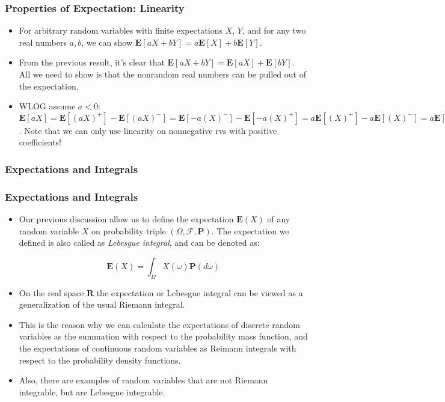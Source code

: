 \documentclass[handout]{beamer}
\newcommand{\BP}{\mathbf{P}}
\newcommand{\BE}{\mathbf{E}}
\begin{document}
\frame
{
  \frametitle{Properties of Expectation: Linearity}

   \begin{itemize}

  \item<1-> [] For arbitrary random variables with finite expectations $X$, $Y$, and for any two real numbers $a,b$, we can show $\BE[aX + bY] = a\BE[X] + b\BE[Y]$.
  
  \item<2-> [] From the previous result, it's clear that $\BE[aX+bY] = \BE[aX] + \BE[bY]$. All we need to show is that the nonrandom real numbers can be pulled out of the expectation.
  
\item<3-> [] WLOG assume $a < 0$: 
$\BE[aX] = \BE[(aX)^+] - \BE[(aX)^-] =  
\BE[-a(X)^-] -  \BE[-a(X)^+] = 
a\BE[(X)^+]  -a\BE[(X)^-]  = a\BE[X]$. Note that we can only use linearity on nonnegative rvs with positive coefficients!


\end{itemize}
}




\subsubsection{Expectations and Integrals }

\frame
{
  \frametitle{Expectations and Integrals}

   \begin{itemize}

   \item<1-> Our previous discussion allow us to define the expectation $\BE(X)$ of any random variable $X$ on probability triple $(\Omega, \mathcal{F}, \BP)$.  The expectation we defined is also called as \textit{Lebesgue integral}, and can be denoted as:
   
   $$\BE(X)=\int_{\Omega} X(\omega) \BP(d \omega) $$
   
     
   \item<2-> On the real space $\mathbf{R}$ the expectation or Lebesgue integral can be viewed as a generalization of the usual Riemann integral. 
   
   \item<3-> This is the reason why we can calculate the expectations of discrete random variables as the summation with respect to the probability mass function, and the expectations of continuous random variables as Reimann integrals with respect to the probability density functions.  
   
   \item<4-> Also, there are examples of random variables that are not Riemann integrable, but are Lebesgue integrable.

\end{itemize}
}
\end{document}
